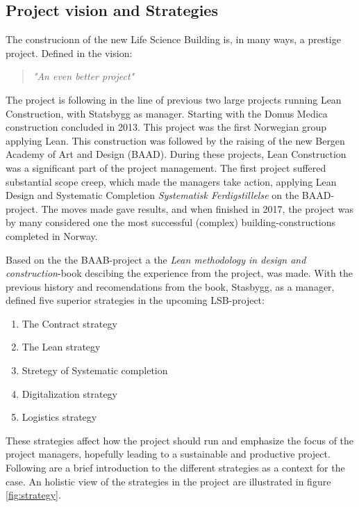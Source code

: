 \subsection{Project vision and Strategies}
The construcionn of the new Life Science Building is, in many ways, a prestige project. Defined in the vision:
\begin{quotation}
    \textit{"An even better project"}
\end{quotation}
The project is following in the line of previous two large projects running Lean Construction, with Statsbygg as manager. Starting with the Domus Medica construction concluded in 2013. This project was the first Norwegian group applying Lean. This construction was followed by the raising of the new Bergen Academy of Art and Design (BAAD). During these projects, Lean Construction was a significant part of the project management. The first project suffered substantial scope creep, which made the managers take action, applying Lean Design and Systematic Completion \textit{Systematisk Ferdigstillelse} on the BAAD-project. The moves made gave results, and when finished in 2017, the project was by many considered one the most successful (complex) building-constructions completed in Norway.

Based on the the BAAB-project a the \textit{Lean methodology in design and construction}-book \cite{lean_i_praksis} descibing the experience from the project, was made. With the previous history and recomendations from the book, Stasbygg, as a manager, defined five superior strategies in the upcoming LSB-project: 
\begin{enumerate}
    \item The Contract strategy
    \item The Lean strategy
    \item Stretegy of Systematic completion
    \item Digitalization strategy
    \item Logistics strategy
\end{enumerate}
These strategies affect how the project should run and emphasize the focus of the project managers, hopefully leading to a sustainable and productive project. Following are a brief introduction to the different strategies as a context for the case. An holistic view of the strategies in the project are illustrated in figure \ref{fig:strategy}. 

